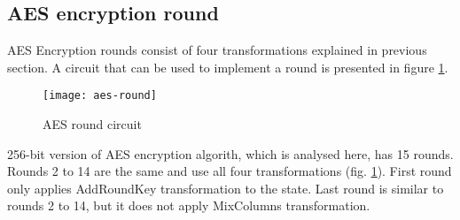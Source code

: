 \subsection{AES encryption round}

AES Encryption rounds consist of four transformations explained in previous section. A circuit that can be used to implement a round is presented in figure \ref{fig:aes-round}.

\begin{figure}[!h]
\centering
\texttt{[image: aes-round]}
\caption{AES round circuit}
\label{fig:aes-round}
\end{figure}

256-bit version of AES encryption algorith, which is analysed here, has 15 rounds. Rounds 2 to 14 are the same and use all four transformations (fig. \ref{fig:aes-round}). First round only applies AddRoundKey transformation to the state. Last round is similar to rounds 2 to 14, but it does not apply MixColumns transformation.

